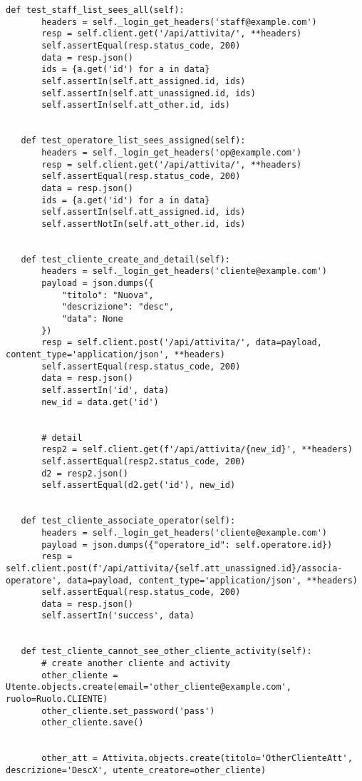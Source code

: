 \documentclass[a4paper]{report}
\begin{document}
\begin{scriptsize}
\begin{lstlisting}[caption={Attivita}, label=lst:javacode]
   def test_staff_list_sees_all(self):
       headers = self._login_get_headers('staff@example.com')
       resp = self.client.get('/api/attivita/', **headers)
       self.assertEqual(resp.status_code, 200)
       data = resp.json()
       ids = {a.get('id') for a in data}
       self.assertIn(self.att_assigned.id, ids)
       self.assertIn(self.att_unassigned.id, ids)
       self.assertIn(self.att_other.id, ids)


   def test_operatore_list_sees_assigned(self):
       headers = self._login_get_headers('op@example.com')
       resp = self.client.get('/api/attivita/', **headers)
       self.assertEqual(resp.status_code, 200)
       data = resp.json()
       ids = {a.get('id') for a in data}
       self.assertIn(self.att_assigned.id, ids)
       self.assertNotIn(self.att_other.id, ids)


   def test_cliente_create_and_detail(self):
       headers = self._login_get_headers('cliente@example.com')
       payload = json.dumps({
           "titolo": "Nuova",
           "descrizione": "desc",
           "data": None
       })
       resp = self.client.post('/api/attivita/', data=payload, content_type='application/json', **headers)
       self.assertEqual(resp.status_code, 200)
       data = resp.json()
       self.assertIn('id', data)
       new_id = data.get('id')


       # detail
       resp2 = self.client.get(f'/api/attivita/{new_id}', **headers)
       self.assertEqual(resp2.status_code, 200)
       d2 = resp2.json()
       self.assertEqual(d2.get('id'), new_id)


   def test_cliente_associate_operator(self):
       headers = self._login_get_headers('cliente@example.com')
       payload = json.dumps({"operatore_id": self.operatore.id})
       resp = self.client.post(f'/api/attivita/{self.att_unassigned.id}/associa-operatore', data=payload, content_type='application/json', **headers)
       self.assertEqual(resp.status_code, 200)
       data = resp.json()
       self.assertIn('success', data)


   def test_cliente_cannot_see_other_cliente_activity(self):
       # create another cliente and activity
       other_cliente = Utente.objects.create(email='other_cliente@example.com', ruolo=Ruolo.CLIENTE)
       other_cliente.set_password('pass')
       other_cliente.save()


       other_att = Attivita.objects.create(titolo='OtherClienteAtt', descrizione='DescX', utente_creatore=other_cliente)



\end{lstlisting}
\end{scriptsize}
\end{document}
